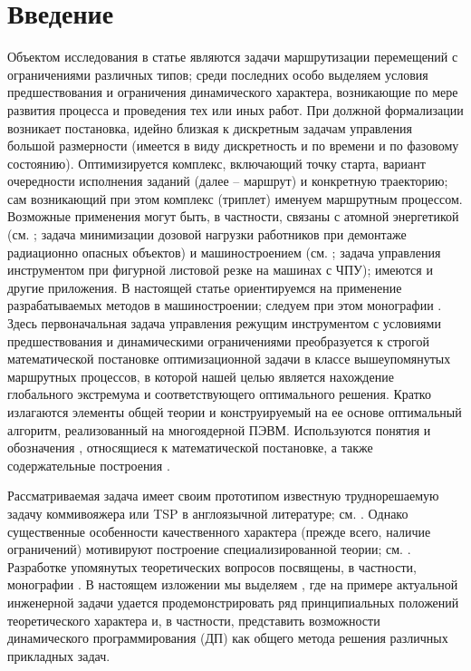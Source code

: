 \documentclass[10pt]{SPIIRAS_Proceedings}
\begin{document}
\maketitle

\normalsize

\section*{Введение}
\label{sec:intro}

Объектом исследования в статье
являются задачи маршрутизации перемещений
с ограничениями различных типов;
среди последних особо выделяем условия
предшествования и ограничения динамического характера,
возникающие по мере развития процесса и проведения тех или иных работ.
При должной формализации возникает постановка,
идейно близкая к дискретным задачам управления большой размерности
(имеется в виду дискретность и по времени и  по фазовому состоянию).
Оптимизируется комплекс, включающий точку старта,
вариант очередности исполнения заданий
(далее -- маршрут)
и конкретную траекторию;
сам возникающий при этом комплекс (триплет)
именуем маршрутным процессом.
Возможные применения могут быть,
в частности, связаны с атомной энергетикой
(см. \cite{1,2,3};
задача минимизации дозовой нагрузки работников при демонтаже радиационно опасных объектов)
и машиностроением (см. \cite{4,5,6};
задача управления инструментом при фигурной листовой резке на машинах с ЧПУ);
имеются и другие приложения.
В настоящей статье ориентируемся на применение разрабатываемых методов в машиностроении;
следуем при этом монографии \cite{4}.
Здесь первоначальная задача управления режущим инструментом
с условиями предшествования и динамическими ограничениями
преобразуется к строгой математической постановке
оптимизационной задачи в классе вышеупомянутых маршрутных процессов,
в которой нашей целью является нахождение
глобального экстремума и соответствующего оптимального решения.
Кратко излагаются элементы общей теории и
конструируемый на ее основе оптимальный алгоритм,
реализованный на многоядерной ПЭВМ.
Используются понятия и обозначения
\cite[часть II]{4},
относящиеся к математической постановке,
а также содержательные построения \cite[часть I]{4}.

Рассматриваемая задача имеет своим прототипом известную труднорешаемую задачу коммивояжера
или TSP в англоязычной литературе; см. \cite{7,8,9,10,11,12}. Однако существенные особенности качественного характера (прежде всего, наличие ограничений) мотивируют построение специализированной теории; см. \cite{1,3,4,5,6,13,14}.
Разработке упомянутых теоретических вопросов посвящены, в частности, монографии \cite{13,14,14`}. В настоящем изложении мы выделяем \cite{4}, где на примере актуальной инженерной задачи удается продемонстрировать ряд принципиальных положений теоретического характера и, в частности, представить возможности динамического программирования (ДП) как общего метода решения различных прикладных задач.
\end{document}
